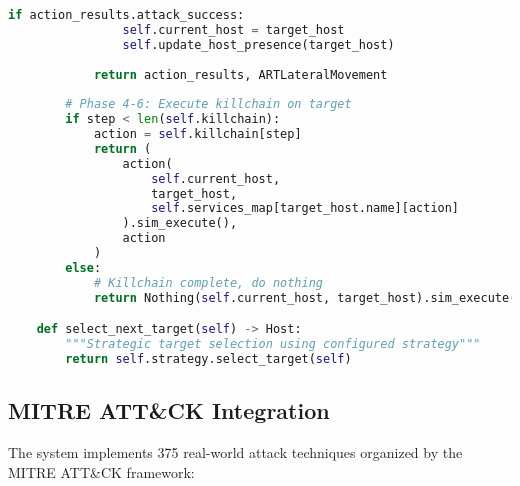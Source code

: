 \documentclass[12pt,a4paper]{article}
\begin{document}
\begin{lstlisting}[language=Python, caption=ART Agent Core Implementation]
            if action_results.attack_success:
                self.current_host = target_host
                self.update_host_presence(target_host)
            
            return action_results, ARTLateralMovement
        
        # Phase 4-6: Execute killchain on target
        if step < len(self.killchain):
            action = self.killchain[step]
            return (
                action(
                    self.current_host,
                    target_host,
                    self.services_map[target_host.name][action]
                ).sim_execute(),
                action
            )
        else:
            # Killchain complete, do nothing
            return Nothing(self.current_host, target_host).sim_execute(), Nothing

    def select_next_target(self) -> Host:
        """Strategic target selection using configured strategy"""
        return self.strategy.select_target(self)
\end{lstlisting}

\subsection{MITRE ATT\&CK Integration}

The system implements 375 real-world attack techniques organized by the MITRE ATT\&CK framework:
\end{document}
